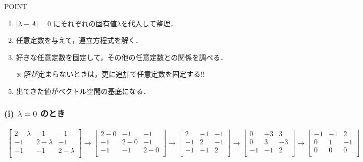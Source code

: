 \documentclass[a4paper]{jsarticle}
\begin{document}
\begin{itembox}[l]{POINT}
	\begin{enumerate}[(1)]
		\item $|\lambda - A| = 0$ にそれぞれの固有値$\lambda$を代入して整理．
		\item 任意定数を与えて，連立方程式を解く．
		\item 好きな任意定数を固定して，その他の任意定数との関係を調べる．
		\item [※] 解が定まらないときは，更に追加で任意定数を固定する!!
		\item 出てきた値がベクトル空間の基底になる．
	\end{enumerate}
\end{itembox}

\subsubsection*{(i) $\lambda = 0$ のとき}

\begin{eqnarray*}
	\begin{bmatrix}
		2-\lambda & -1        & -1        \\
		-1        & 2-\lambda & -1        \\
		-1        & -1        & 2-\lambda \\
	\end{bmatrix}
	\rightarrow
	\begin{bmatrix}
		2-0 & -1  & -1  \\
		-1  & 2-0 & -1  \\
		-1  & -1  & 2-0 \\
	\end{bmatrix}
	\rightarrow
	\begin{bmatrix}
		2  & -1 & -1 \\
		-1 & 2  & -1 \\
		-1 & -1 & 2  \\
	\end{bmatrix}
	\rightarrow
	\begin{bmatrix}
		0  & -3 & 3  \\
		0  & 3  & -3 \\
		-1 & -1 & 2  \\
	\end{bmatrix}
	\rightarrow
	\begin{bmatrix}
		-1 & -1 & 2  \\
		0  & 1  & -1 \\
		0  & 0  & 0  \\
	\end{bmatrix}\\
\end{eqnarray*}
\end{document}

